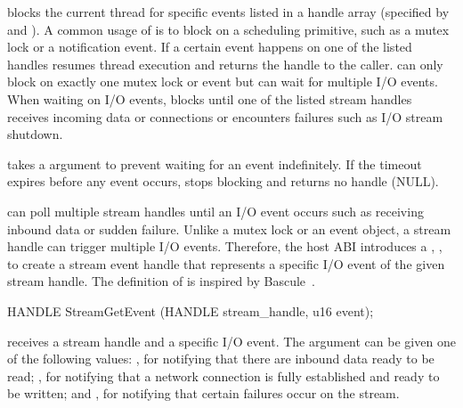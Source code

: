 blocks the current thread for specific events listed in
a handle array (specified by  and ).
A common usage of 
is to block on a scheduling primitive,
such as a mutex lock or a notification event.
If a certain event happens on one of the listed handles
 resumes thread execution
and returns the handle to the caller. 
 can only block on exactly one mutex lock or event but can wait for
multiple I/O events.
When waiting on I/O events,
 blocks until one of the listed stream handles receives incoming data or connections
or encounters failures such as I/O stream shutdown.


 takes a  argument to prevent waiting for an event indefinitely.
If the timeout expires before any event occurs,
 stops blocking
and returns no handle (NULL).


 can poll multiple stream handles until an I/O event occurs
such as receiving inbound data or sudden failure.
Unlike a mutex lock or an event object, a stream handle can trigger multiple I/O events.
Therefore, the host ABI introduces a \hostapi{}, , to create a stream event handle
that represents a specific I/O event of the given stream handle.
The definition of  is inspired by Bascule~\cite{baumann13bascule}.


\begin{paldef}
HANDLE StreamGetEvent (HANDLE stream_handle, u16 event);
\end{paldef}


 receives a stream handle and a specific I/O event.
The  argument can be given
one of the following values:
, for notifying that there are inbound data ready to be read;
, for notifying
that a network connection is fully established
and ready to be written;
and , for notifying that certain failures occur on the stream.

